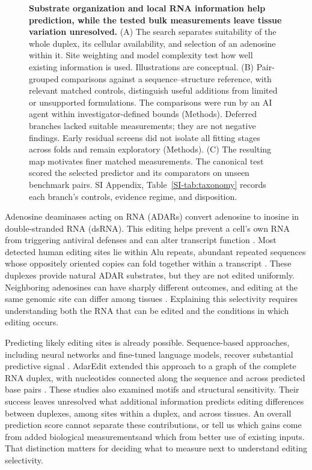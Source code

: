 \documentclass[9pt,twocolumn,twoside]{pnas-new}
\newcommand{\SIref}[1]{\ref*{SI-#1}}
\begin{document}
\begin{figure}[t!]
\centering

\caption{\textbf{Substrate organization and local RNA information help prediction, while the tested bulk measurements leave tissue variation unresolved.} (A) The search separates suitability of the whole duplex, its cellular availability, and selection of an adenosine within it. Site weighting and model complexity test how well existing information is used. Illustrations are conceptual. (B) Pair-grouped comparisons against a sequence--structure reference, with relevant matched controls, distinguish useful additions from limited or unsupported formulations. The comparisons were run by an AI agent within investigator-defined bounds (Methods). Deferred branches lacked suitable measurements; they are not negative findings. Early residual screens did not isolate all fitting stages across folds and remain exploratory (Methods). (C) The resulting map motivates finer matched measurements. The canonical test scored the selected predictor and its comparators on unseen benchmark pairs. SI Appendix, Table~\SIref{tab:taxonomy} records each branch's controls, evidence regime, and disposition.}
\label{fig:search}
\end{figure}

Adenosine deaminases acting on RNA (ADARs) convert adenosine to inosine in double-stranded RNA (dsRNA). This editing helps prevent a cell's own RNA from triggering antiviral defenses and can alter transcript function \cite{Bass2002,Nishikura2016,Eisenberg2018,Liddicoat2015,Mannion2014}. Most detected human editing sites lie within Alu repeats, abundant repeated sequences whose oppositely oriented copies can fold together within a transcript \cite{Levanon2004,Athanasiadis2004,Kim2004,Bazak2014Hundred,Porath2014}. These duplexes provide natural ADAR substrates, but they are not edited uniformly. Neighboring adenosines can have sharply different outcomes, and editing at the same genomic site can differ among tissues \cite{Tan2017,Picardi2015}. Explaining this selectivity requires understanding both the RNA that can be edited and the conditions in which editing occurs.

Predicting likely editing sites is already possible. Sequence-based approaches, including neural networks and fine-tuned language models, recover substantial predictive signal \cite{Ouyang2018DeepRed,Wang2021EditPredict,Rosenwasser2026AdarGPT}. AdarEdit extended this approach to a graph of the complete RNA duplex, with nucleotides connected along the sequence and across predicted base pairs \cite{Rosenwasser2026AdarEdit}. These studies also examined motifs and structural sensitivity. Their success leaves unresolved what additional information predicts editing differences between duplexes, among sites within a duplex, and across tissues. An overall prediction score cannot separate these contributions, or tell us which gains come from added biological measurements\Parasplit and which from better use of existing inputs. That distinction matters for deciding what to measure next to understand editing selectivity.
\end{document}
